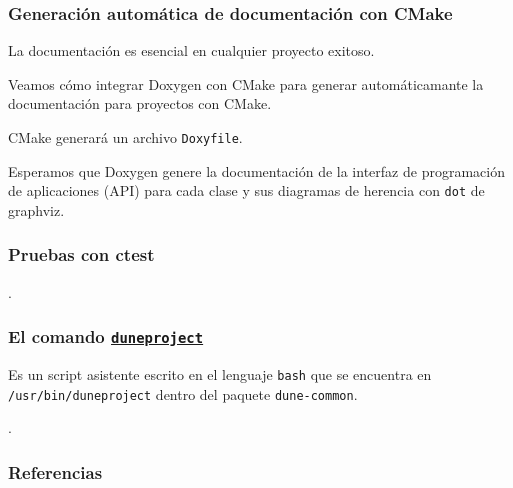 \begin{frame}[fragile]
	\frametitle{Generación automática de documentación con CMake}
	La documentación es esencial en cualquier proyecto exitoso.

	Veamos cómo integrar Doxygen con CMake para generar
	automáticamante la documentación para proyectos con CMake.

	CMake generará un archivo \lstinline{Doxyfile}.

	Esperamos que Doxygen genere la documentación de la interfaz de
	programación de aplicaciones (API) para cada clase y sus
	diagramas de herencia con \lstinline{dot} de graphviz.
\end{frame}

\begin{frame}[fragile]
	\frametitle{Pruebas con ctest}
	.
\end{frame}



\begin{frame}[fragile]
	\frametitle{El comando \href{https://gitlab.dune-project.org/core/dune-common/-/raw/master/bin/duneproject}{\lstinline{duneproject}}}

	Es un script asistente escrito en el lenguaje \lstinline{bash}
	que se encuentra en \lstinline{/usr/bin/duneproject}
	dentro del paquete \lstinline{dune-common}.
\end{frame}

\begin{frame}
	.
\end{frame}

\begin{frame}\transblindsvertical
	\frametitle{Referencias}
\end{frame}


